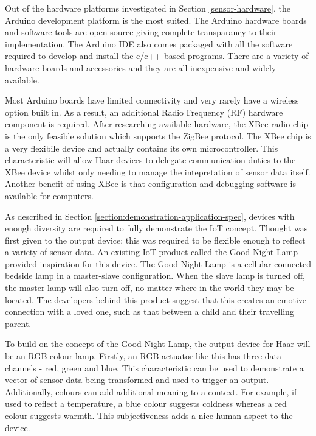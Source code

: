         Out of the hardware platforms investigated in Section \ref{sensor-hardware}, the Arduino development platform is the most suited. The Arduino hardware boards and software tools are open source giving complete transparancy to their implementation. The Arduino IDE also comes packaged with all the software required to develop and install the c/c++ based programs. There are a variety of hardware boards and accessories and they are all inexpensive and widely available.

        Most Arduino boards have limited connectivity and very rarely have a wireless option built in. As a result, an additional Radio Frequency (RF) hardware component is required. After researching available hardware, the XBee radio chip is the only feasible solution which supports the ZigBee protocol. The XBee chip is a very flexibile device and actually contains its own microcontroller. This characteristic will allow Haar devices to delegate communication duties to the XBee device whilst only needing to manage the intepretation of sensor data itself. Another benefit of using XBee is that configuration and debugging software is available for computers.

        As described in Section \ref{section:demonstration-application-spec}, devices with enough diversity are required to fully demonstrate the IoT concept. Thought was first given to the output device; this was required to be flexible enough to reflect a variety of sensor data. An existing IoT product called the Good Night Lamp provided inspiration for this device. The Good Night Lamp is a cellular-connected bedside lamp in a master-slave configuration. When the slave lamp is turned off, the master lamp will also turn off, no matter where in the world they may be located. The developers behind this product suggest that this creates an emotive connection with a loved one, such as that between a child and their travelling parent.

        To build on the concept of the Good Night Lamp, the output device for Haar will be an RGB colour lamp. Firstly, an RGB actuator like this has three data channels - red, green and blue. This characteristic can be used to demonstrate a vector of sensor data being transformed and used to trigger an output. Additionally, colours can add additional meaning to a context. For example, if used to reflect a temperature, a blue colour suggests coldness whereas a red colour suggests warmth. This subjectiveness adds a nice human aspect to the device.

